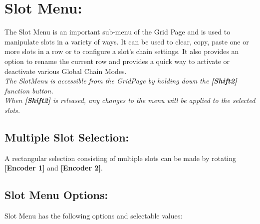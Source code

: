 \chapter{Slot Menu:}

The Slot Menu is an important sub-menu of the Grid Page and is used to manipulate slots in a variety of ways. It can be used to clear, copy, paste one or more slots in a row or to configure a slot's chain settings. It also provides an option to rename the current row and provides a quick way to activate or deactivate various Global Chain Modes.
\\
\textit{The SlotMenu is accessible from the GridPage by holding down the  \textbf{[Shift2]} function button.\\
When \textbf{[Shift2]} is released, any changes to the menu will be applied to the selected slots. }
\\
\section{Multiple Slot Selection:}
A rectangular selection consisting of multiple slots can be made by rotating \textbf{[Encoder 1]} and \textbf{[Encoder 2]}.


\section{Slot Menu Options:}
Slot Menu has the following options and selectable values:

